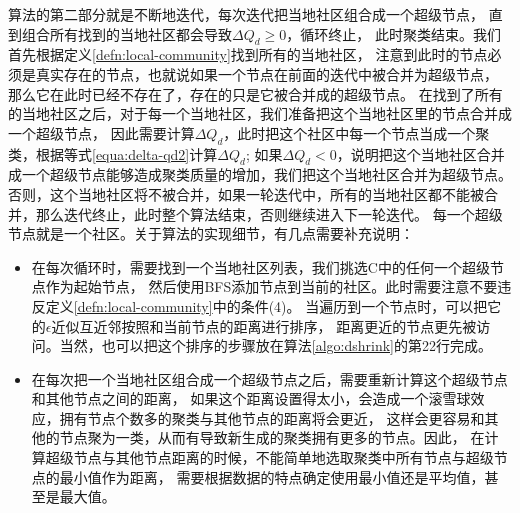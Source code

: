 算法的第二部分就是不断地迭代，每次迭代把当地社区组合成一个超级节点，
直到组合所有找到的当地社区都会导致$\Delta Q_d \geq 0$，循环终止，
此时聚类结束。我们首先根据定义\ref{defn:local-community}找到所有的当地社区，
注意到此时的节点必须是真实存在的节点，也就说如果一个节点在前面的迭代中被合并为超级节点，
那么它在此时已经不存在了，存在的只是它被合并成的超级节点。
在找到了所有的当地社区之后，对于每一个当地社区，我们准备把这个当地社区里的节点合并成一个超级节点，
因此需要计算$\Delta Q_d$，此时把这个社区中每一个节点当成一个聚类，根据等式\ref{equa:delta-qd2}计算$\Delta Q_d$;
如果$\Delta Q_d < 0$，说明把这个当地社区合并成一个超级节点能够造成聚类质量的增加，我们把这个当地社区合并为超级节点。
否则，这个当地社区将不被合并，如果一轮迭代中，所有的当地社区都不能被合并，那么迭代终止，此时整个算法结束，否则继续进入下一轮迭代。
每一个超级节点就是一个社区。关于算法的实现细节，有几点需要补充说明：

\begin{itemize}
    \item 在每次循环时，需要找到一个当地社区列表，我们挑选C中的任何一个超级节点作为起始节点，
    然后使用BFS添加节点到当前的社区。此时需要注意不要违反定义\ref{defn:local-community}中的条件(4)。
    当遍历到一个节点时，可以把它的$\epsilon$近似互近邻按照和当前节点的距离进行排序，
    距离更近的节点更先被访问。当然，也可以把这个排序的步骤放在算法\ref{algo:dshrink}的第22行完成。

    \item 在每次把一个当地社区组合成一个超级节点之后，需要重新计算这个超级节点和其他节点之间的距离，
    如果这个距离设置得太小，会造成一个滚雪球效应，拥有节点个数多的聚类与其他节点的距离将会更近，
    这样会更容易和其他的节点聚为一类，从而有导致新生成的聚类拥有更多的节点。因此，
    在计算超级节点与其他节点距离的时候，不能简单地选取聚类中所有节点与超级节点的最小值作为距离，
    需要根据数据的特点确定使用最小值还是平均值，甚至是最大值。
\end{itemize}


